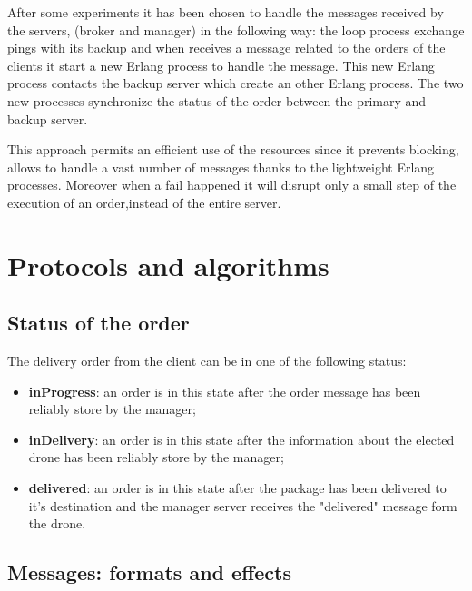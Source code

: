 \documentclass[a4paper, oneside]{memoir}
\begin{document}
After some experiments it has been chosen to handle the messages received by the servers, (broker and manager) in the following way: the loop process exchange pings with its backup and when receives a message related to the orders of the clients it start a new Erlang process to handle the message. This new Erlang process contacts the backup server which create an other Erlang process. The two new processes synchronize the status of the order between the primary and backup server.

This approach permits an efficient use of the resources since it prevents blocking, allows to handle a vast number of messages thanks to the lightweight Erlang processes. Moreover when a fail happened it will disrupt only a small step of the execution of an order,instead of the entire server.


\section{Protocols and algorithms}


\subsection{Status of the order}
The delivery order from the client can be in one of the following status:
\begin{itemize}
\item \textbf{inProgress}: an order is in this state after the order message has been reliably store by the manager;
\item \textbf{inDelivery}: an order is in this state after the information about the elected drone has been reliably store by the manager;
\item \textbf{delivered}: an order is in this state after the package has been delivered to it's destination and the manager server receives the "delivered" message form the drone.
\end{itemize}


\newpage
\subsection{Messages: formats and effects}
\end{document}
